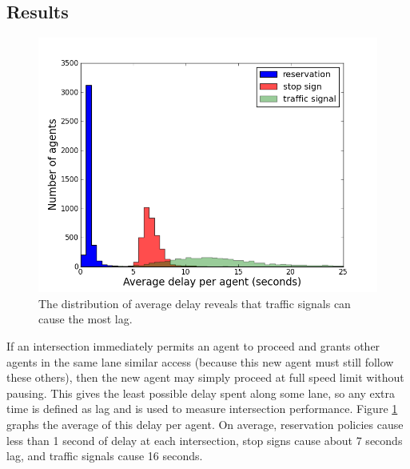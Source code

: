 \documentclass[letterpaper, 10 pt, conference]{ieeeconf}  %
\begin{document}
\subsection{Results}

\begin{figure}[h]
  \centering \includegraphics[width=\linewidth]{avg_lag_agent_atx.png}
  \caption{The distribution of average delay reveals that traffic signals can
           cause the most lag.}
  \label{fig:avg_lag}
  \vspace{-10pt}
\end{figure}

If an intersection immediately permits an agent to proceed and grants other
agents in the same lane similar access (because this new agent must still follow
these others), then the new agent may simply proceed at full speed limit without
pausing. This gives the least possible delay spent along some lane, so any extra
time is defined as lag and is used to measure intersection performance. Figure
\ref{fig:avg_lag} graphs the average of this delay per agent. On average,
reservation policies cause less than 1 second of delay at each intersection,
stop signs cause about 7 seconds lag, and traffic signals cause 16 seconds.
\end{document}
